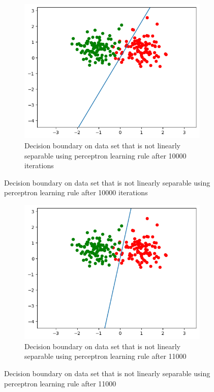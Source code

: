 \documentclass[a4paper]{article}
\begin{document}
\begin{figure}[htb]
    \centering
    \begin{subfigure}{0.4\textwidth}
        \includegraphics[width=\textwidth]{Labs/Lab 1/Lab 1a/Results/p_non_linear500.png}
        \caption{Decision boundary on data set that is not linearly separable  using perceptron learning rule after 10000 iterations}
        \label{fig:Decision-boundary-not-linearly-separable}
    \end{subfigure}
    \hfill
\end{figure}

\begin{figure}[htb]
    \centering
    \begin{subfigure}{0.4\textwidth}
        \includegraphics[width=\textwidth]{Labs/Lab 1/Lab 1a/Results/p_non_linear1000.png}
        \caption{Decision boundary on data set that is not linearly separable  using perceptron learning rule after 11000}
        \label{fig:Decision-boundary-not-linearly-separable}
    \end{subfigure}
    \hfill
\end{figure}
\end{document}
